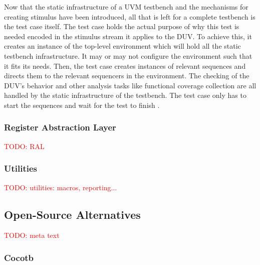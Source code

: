 \documentclass[11pt]{report}
\newcommand{\todo}[1]{\textcolor{red}{TODO: #1}}
\begin{document}
Now that the static infrastructure of a UVM testbench and the mechanisms for creating stimulus have been introduced, all that is left for a complete testbench is the test case itself. The test case holds the actual purpose of why this test is needed encoded in the stimulus stream it applies to the DUV. To achieve this, it creates an instance of the top-level environment which will hold all the static testbench infrastructure. It may or may not configure the environment such that it fits its needs. Then, the test case creates instances of relevant sequences and directs them to the relevant sequencers in the environment. The checking of the DUV's behavior and other analysis tasks like functional coverage collection are all handled by the static infrastructure of the testbench. The test case only has to start the sequences and wait for the test to finish \cite[Ch. 4.3]{mehta2018asic}.

\subsubsection{Register Abstraction Layer} %

\todo{RAL}


\subsubsection{Utilities} %

\todo{utilities: macros, reporting...}


\subsection{Open-Source Alternatives} %

\todo{meta text}

\subsubsection{Cocotb} %
\end{document}
